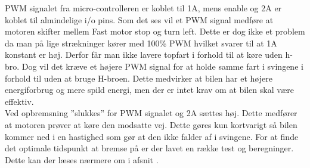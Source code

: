 PWM signalet fra micro-controlleren er koblet til 1A, mens enable og 2A er koblet til almindelige i/o pins. Som det ses vil et PWM signal medføre at motoren skifter mellem Fast motor stop og turn left. Dette er dog ikke et problem da man på lige strækninger kører med 100\% PWM hvilket svarer til at 1A konstant er høj. Derfor får man ikke lavere topfart i forhold til at køre uden h-bro. Dog vil det kræve et højere PWM signal for at holde samme fart i svingene i forhold til uden at bruge H-broen. Dette medvirker at bilen har et højere energiforbrug og mere spild energi, men der er intet krav om at bilen skal være effektiv.  \\

Ved opbremsning ”slukkes” for PWM signalet og 2A sættes høj. Dette medfører at motoren prøver at køre den modsatte vej. Dette gøres kun kortvarigt så bilen kommer ned i en hastighed som gør at den ikke falder af i svingene. For at finde det optimale tidspunkt at bremse på er der lavet en række test og beregninger. Dette kan der læses nærmere om i afsnit .
